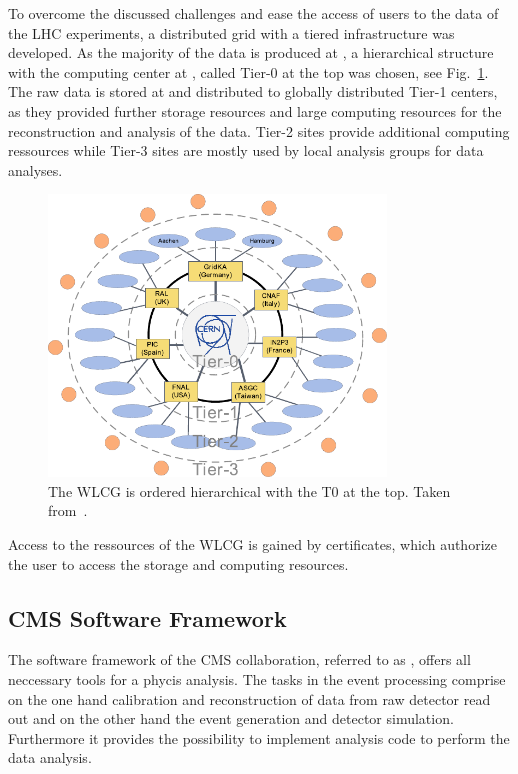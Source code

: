 To overcome the discussed challenges and ease the access of users to the data of
the LHC experiments, a distributed grid with a tiered infrastructure was
developed. As the majority of the data is produced at \CERN, a hierarchical
structure with the computing center at \CERN, called Tier-0 at the top was
chosen, see Fig.~\ref{fig:lhc_tier_structure}. The raw data is stored at \CERN
and distributed to globally distributed Tier-1 centers, as they provided further
storage resources and large computing resources for the reconstruction and
analysis of the data. Tier-2 sites provide additional computing ressources while
Tier-3 sites are mostly used by local analysis groups for data analyses.

\begin{figure}[htp]
    \centering
    \includegraphics[width=0.8\textwidth]{figures/cms_detector/lhcg.pdf}\hfill
    \caption[Tiered structure of the worldwide LHC Computing Grid]{The WLCG is
        ordered hierarchical with the \CERN T0 at the top. Taken
        from~\cite{Stober:2012abc}.}
    \label{fig:lhc_tier_structure}
\end{figure}

Access to the ressources of the WLCG is gained by certificates, which authorize
the user to access the storage and computing resources.


\subsection{CMS Software Framework}

The software framework of the CMS collaboration, referred to as \CMSSW, offers
all neccessary tools for a phycis analysis. The tasks in the event processing
comprise on the one hand calibration and reconstruction of data from raw
detector read out and on the other hand the event generation and detector
simulation. Furthermore it provides the possibility to implement analysis code
to perform the data analysis. 

